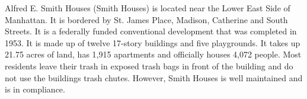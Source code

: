 

Alfred E. Smith Houses (Smith Houses) is located near the Lower East Side of Manhattan. It is bordered by St. James Place, Madison, Catherine and South Streets. It is a federally funded conventional development that was completed in 1953. It is made up of twelve 17-story buildings and five playgrounds. It takes up 21.75 acres of land,  has 1,915 apartments and officially houses 4,072 people. Most residents leave their trash in exposed trash bags in front of the building and do not use the buildings trash chutes. However, Smith Houses is well maintained and is in compliance.